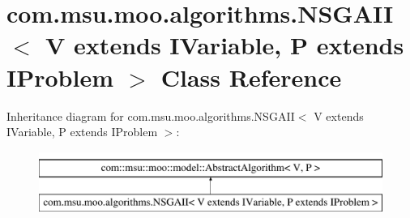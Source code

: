 \hypertarget{classcom_1_1msu_1_1moo_1_1algorithms_1_1NSGAII_3_01V_01extends_01IVariable_00_01P_01extends_01IProblem_01_4}{\section{com.\-msu.\-moo.\-algorithms.\-N\-S\-G\-A\-I\-I$<$ V extends I\-Variable, P extends I\-Problem $>$ Class Reference}
\label{classcom_1_1msu_1_1moo_1_1algorithms_1_1NSGAII_3_01V_01extends_01IVariable_00_01P_01extends_01IProblem_01_4}
}
Inheritance diagram for com.\-msu.\-moo.\-algorithms.\-N\-S\-G\-A\-I\-I$<$ V extends I\-Variable, P extends I\-Problem $>$\-:\begin{figure}[H]
\begin{center}
\leavevmode
\includegraphics[height=2.000000cm]{classcom_1_1msu_1_1moo_1_1algorithms_1_1NSGAII_3_01V_01extends_01IVariable_00_01P_01extends_01IProblem_01_4}
\end{center}
\end{figure}

